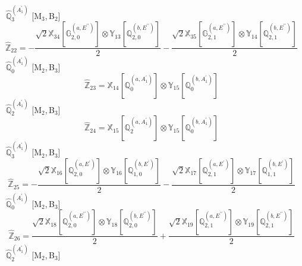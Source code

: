 \documentclass[fleqn,10pt,landscape]{article}
\begin{document}
\begin{itemize}
\begin{dmath*}
\end{dmath*}
\vspace{4mm}
\noindent {} $\,\,\,\hat{\mathbb{Q}}_{3}^{(A_{1}^{\prime})}$ [M$_{3}$,\,B$_{2}$]
\begin{dmath*}
\hat{\mathbb{Z}}_{22}=- \frac{\sqrt{2} \mathbb{X}_{34}[\mathbb{G}_{2,0}^{(a,E^{\prime\prime})}] \otimes\mathbb{Y}_{13}[\mathbb{Q}_{2,0}^{(b,E^{\prime\prime})}]}{2} - \frac{\sqrt{2} \mathbb{X}_{35}[\mathbb{G}_{2,1}^{(a,E^{\prime\prime})}] \otimes\mathbb{Y}_{14}[\mathbb{Q}_{2,1}^{(b,E^{\prime\prime})}]}{2}
\end{dmath*}
\vspace{4mm}
\noindent {} $\,\,\,\hat{\mathbb{Q}}_{0}^{(A_{1}^{\prime})}$ [M$_{2}$,\,B$_{3}$]
\begin{dmath*}
\hat{\mathbb{Z}}_{23}=\mathbb{X}_{14}[\mathbb{Q}_{0}^{(a,A_{1}^{\prime})}] \otimes\mathbb{Y}_{15}[\mathbb{Q}_{0}^{(b,A_{1}^{\prime})}]
\end{dmath*}
\vspace{4mm}
\noindent {} $\,\,\,\hat{\mathbb{Q}}_{2}^{(A_{1}^{\prime})}$ [M$_{2}$,\,B$_{3}$]
\begin{dmath*}
\hat{\mathbb{Z}}_{24}=\mathbb{X}_{15}[\mathbb{Q}_{2}^{(a,A_{1}^{\prime})}] \otimes\mathbb{Y}_{15}[\mathbb{Q}_{0}^{(b,A_{1}^{\prime})}]
\end{dmath*}
\vspace{4mm}
\noindent {} $\,\,\,\hat{\mathbb{Q}}_{3}^{(A_{1}^{\prime})}$ [M$_{2}$,\,B$_{3}$]
\begin{dmath*}
\hat{\mathbb{Z}}_{25}=- \frac{\sqrt{2} \mathbb{X}_{16}[\mathbb{Q}_{2,0}^{(a,E^{\prime})}] \otimes\mathbb{Y}_{16}[\mathbb{Q}_{1,0}^{(b,E^{\prime})}]}{2} - \frac{\sqrt{2} \mathbb{X}_{17}[\mathbb{Q}_{2,1}^{(a,E^{\prime})}] \otimes\mathbb{Y}_{17}[\mathbb{Q}_{1,1}^{(b,E^{\prime})}]}{2}
\end{dmath*}
\vspace{4mm}
\noindent {} $\,\,\,\hat{\mathbb{Q}}_{0}^{(A_{1}^{\prime})}$ [M$_{2}$,\,B$_{3}$]
\begin{dmath*}
\hat{\mathbb{Z}}_{26}=\frac{\sqrt{2} \mathbb{X}_{18}[\mathbb{Q}_{2,0}^{(a,E^{\prime\prime})}] \otimes\mathbb{Y}_{18}[\mathbb{Q}_{2,0}^{(b,E^{\prime\prime})}]}{2} + \frac{\sqrt{2} \mathbb{X}_{19}[\mathbb{Q}_{2,1}^{(a,E^{\prime\prime})}] \otimes\mathbb{Y}_{19}[\mathbb{Q}_{2,1}^{(b,E^{\prime\prime})}]}{2}
\end{dmath*}
\vspace{4mm}
\noindent {} $\,\,\,\hat{\mathbb{Q}}_{2}^{(A_{1}^{\prime})}$ [M$_{2}$,\,B$_{3}$]

\end{itemize}
\end{document}

